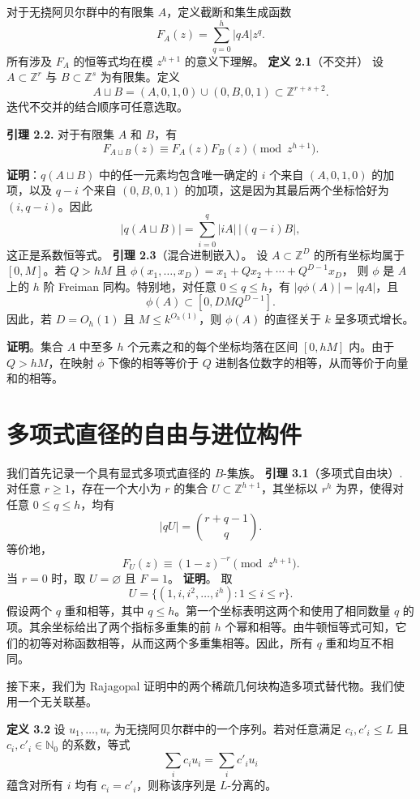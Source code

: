 \documentclass[11pt]{article}
\theoremstyle{break}
\begin{document}
对于无挠阿贝尔群中的有限集 $A$，定义截断和集生成函数
\[
F_A(z) = \sum_{q=0}^h |qA| z^q.
\]
所有涉及 $F_A$ 的恒等式均在模 $z^{h+1}$ 的意义下理解。
\textbf{定义 2.1}（不交并）
设 $A \subset \mathbb{Z}^r$ 与 $B \subset \mathbb{Z}^s$ 为有限集。定义
\[ A \sqcup B = (A,0,1,0) \cup (0,B,0,1) \subset \mathbb{Z}^{r+s+2}. \]
迭代不交并的结合顺序可任意选取。

\textbf{引理 2.2.} 对于有限集 $A$ 和 $B$，有
\[
F_{A \sqcup B}(z) \equiv F_A(z) F_B(z) \pmod{z^{h+1}}.
\]

\textbf{证明}：$q(A \sqcup B)$ 中的任一元素均包含唯一确定的 $i$ 个来自 $(A,0,1,0)$ 的加项，以及 $q-i$ 个来自 $(0,B,0,1)$ 的加项，这是因为其最后两个坐标恰好为 $(i,q-i)$。因此
\[
|q(A \sqcup B)| = \sum_{i=0}^q |iA| \, |(q-i)B|,
\]
这正是系数恒等式。
\textbf{引理 2.3}（混合进制嵌入）。
设 $A \subset \mathbb{Z}^D$ 的所有坐标均属于 $[0, M]$。若 $Q > hM$ 且 $\phi(x_1, \dots, x_D) = x_1 + Q x_2 + \cdots + Q^{D-1} x_D$，
则 $\phi$ 是 $A$ 上的 $h$ 阶 Freiman 同构。特别地，对任意 $0 \le q \le h$，有 $|q\phi(A)| = |qA|$，且
\[
\phi(A) \subset [0, D M Q^{D-1}].
\]
因此，若 $D = O_h(1)$ 且 $M \le k^{O_h(1)}$，则 $\phi(A)$ 的直径关于 $k$ 呈多项式增长。

\textbf{证明}。集合 $A$ 中至多 $h$ 个元素之和的每个坐标均落在区间 $[0, hM]$ 内。由于 $Q > hM$，在映射 $\phi$ 下像的相等等价于 $Q$ 进制各位数字的相等，从而等价于向量和的相等。
\section{多项式直径的自由与进位构件}

我们首先记录一个具有显式多项式直径的 $B$-集族。
\textbf{引理 3.1}（多项式自由块）.
对任意 $r \ge 1$，存在一个大小为 $r$ 的集合 $U \subset \mathbb{Z}^{h+1}$，其坐标以 $r^h$ 为界，使得对任意 $0 \le q \le h$，均有
\[ |qU| = \binom{r+q-1}{q}. \]
等价地，
\[ F_U(z) \equiv (1-z)^{-r} \pmod{z^{h+1}}. \]
当 $r=0$ 时，取 $U = \varnothing$ 且 $F = 1$。
\textbf{证明}。
取
\[ U = \{(1, i, i^2, \dots, i^h) : 1 \le i \le r\}. \]
假设两个 $q$ 重和相等，其中 $q \le h$。第一个坐标表明这两个和使用了相同数量 $q$ 的项。其余坐标给出了两个指标多重集的前 $h$ 个幂和相等。由牛顿恒等式可知，它们的初等对称函数相等，从而这两个多重集相等。因此，所有 $q$ 重和均互不相同。

接下来，我们为 Rajagopal 证明中的两个稀疏几何块构造多项式替代物。我们使用一个无关联基。

\textbf{定义 3.2} 设 $u_1, \dots, u_r$ 为无挠阿贝尔群中的一个序列。若对任意满足 $c_i, c'_i \le L$ 且 $c_i, c'_i \in \mathbb{N}_0$ 的系数，等式
\[ \sum_i c_i u_i = \sum_i c'_i u_i \]
蕴含对所有 $i$ 均有 $c_i = c'_i$，则称该序列是 $L$-分离的。
\end{document}
